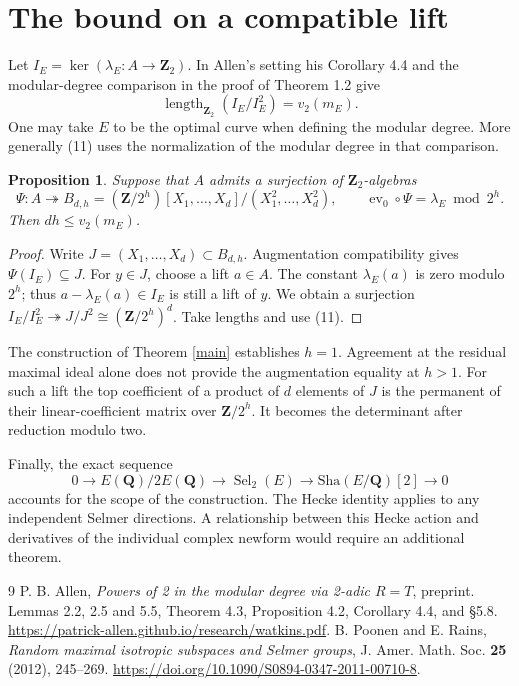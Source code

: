 \documentclass[11pt]{article}
\newtheorem{proposition}[theorem]{Proposition}
\newcommand{\Q}{\mathbf Q}
\newcommand{\Z}{\mathbf Z}
\newcommand{\Sel}{\operatorname{Sel}}
\newcommand{\Sh}{\mathrm{Sha}}
\begin{document}
\section{The bound on a compatible lift}
Let \(I_E=\ker(\lambda_E:A\to\Z_2)\). In Allen's setting his Corollary 4.4 and the modular-degree comparison in the proof of Theorem 1.2 give
\[
 \operatorname{length}_{\Z_2}(I_E/I_E^2)=v_2(m_E).
\tag{11}
\]
One may take \(E\) to be the optimal curve when defining the modular degree. More generally (11) uses the normalization of the modular degree in that comparison.

\begin{proposition}
Suppose that \(A\) admits a surjection of \(\Z_2\)-algebras
\[
 \Psi:A\twoheadrightarrow B_{d,h}
  =(\Z/2^h)[X_1,\ldots,X_d]/(X_1^2,\ldots,X_d^2),
 \qquad \operatorname{ev}_0\circ\Psi=\lambda_E\bmod 2^h .
\]
Then \(dh\le v_2(m_E)\).
\end{proposition}
\begin{proof}
Write \(J=(X_1,\ldots,X_d)\subset B_{d,h}\). Augmentation compatibility gives \(\Psi(I_E)\subseteq J\). For \(y\in J\), choose a lift \(a\in A\). The constant \(\lambda_E(a)\) is zero modulo \(2^h\); thus \(a-\lambda_E(a)\in I_E\) is still a lift of \(y\). We obtain a surjection \(I_E/I_E^2\twoheadrightarrow J/J^2\cong(\Z/2^h)^d\). Take lengths and use (11).
\end{proof}
The construction of Theorem \ref{main} establishes \(h=1\). Agreement at the residual maximal ideal alone does not provide the augmentation equality at \(h>1\). For such a lift the top coefficient of a product of \(d\) elements of \(J\) is the permanent of their linear-coefficient matrix over \(\Z/2^h\). It becomes the determinant after reduction modulo two.

Finally, the exact sequence
\[
 0\longrightarrow E(\Q)/2E(\Q)\longrightarrow\Sel_2(E)
 \longrightarrow\Sh(E/\Q)[2]\longrightarrow0
\]
accounts for the scope of the construction. The Hecke identity applies to any independent Selmer directions. A relationship between this Hecke action and derivatives of the individual complex newform would require an additional theorem.

\begin{thebibliography}{9}
 P. B. Allen, \emph{Powers of 2 in the modular degree via 2-adic \(R=T\)}, preprint. Lemmas 2.2, 2.5 and 5.5, Theorem 4.3, Proposition 4.2, Corollary 4.4, and \S5.8. \url{https://patrick-allen.github.io/research/watkins.pdf}.
 B. Poonen and E. Rains, \emph{Random maximal isotropic subspaces and Selmer groups}, J. Amer. Math. Soc. \textbf{25} (2012), 245--269. \url{https://doi.org/10.1090/S0894-0347-2011-00710-8}.
\end{thebibliography}
\end{document}
